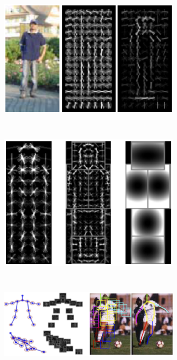 \documentclass[10pt,twocolumn,letterpaper]{article}
\begin{document}
 \begin{figure}
	 \centering
	 \begin{subfigure}[b]{0.25\textwidth}
 		\includegraphics[width=1\textwidth]{pictures/stateoftheart/hog.eps}
 		\caption{}
    		\label{fig:soa_hog}
 	\end{subfigure}
	 ~
	\begin{subfigure}[b]{0.22\textwidth}
 		\includegraphics[width=1\textwidth]{pictures/stateoftheart/felzenszwalb2010object.eps}
 		\caption{}
    		\label{fig:soa_dpm}
 	\end{subfigure}
	 ~
	\begin{subfigure}[b]{0.42\textwidth}
 		\includegraphics[width=1\textwidth]{pictures/stateoftheart/yang2012articulated.eps} 			

\end{subfigure}
\end{figure}
\end{document}
